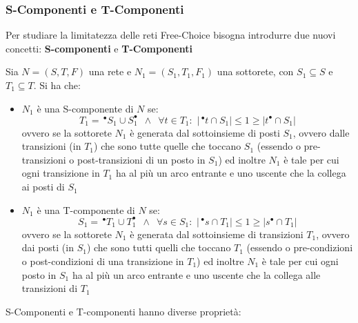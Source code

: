 \documentclass[a4paper,12pt, oneside]{book}
\begin{document}
\subsubsection{S-Componenti e T-Componenti}
Per studiare la limitatezza delle reti Free-Choice bisogna introdurre due nuovi
concetti: \textbf{S-componenti} e \textbf{T-Componenti}
\begin{definizione}
  Sia $N = (S, T , F )$ una rete e $N_1 = (S_1 , T_1 , F_1 )$ una sottorete, con
  $S_1\subseteq S$ e $T_1\subseteq T$. Si ha che:
  \begin{itemize}
    \item $N_1$ è una S-componente di $N$ se:
    \[T_1=\,^\bullet S_1\cup S_1^\bullet \,\,\,\land \,\,\,\forall t\in
      T_1:\,\, |\,^\bullet t\cap S_1|\leq 1 \geq |t^\bullet \cap S_1|\]
    ovvero se la sottorete $N_1$ è generata dal sottoinsieme di posti $S_1$,
    ovvero dalle transizioni (in $T_1$) che sono tutte quelle che toccano $S_1$
    (essendo o pre-transizioni o post-transizioni di un posto in $S_1$) ed
    inoltre $N_1$ è tale per cui ogni transizione in $T_1$ ha al più un arco
    entrante e uno uscente che la collega ai posti di $S_1$
    \item $N_1$ è una T-componente di $N$ se:
    \[S_1=\,^\bullet T_1\cup T_1^\bullet \,\,\,\land \,\,\,\forall s\in
      S_1:\,\, |\,^\bullet s\cap T_1|\leq 1 \geq |s^\bullet \cap T_1|\]
    ovvero se la sottorete $N_1$ è generata dal sottoinsieme di transizioni
    $T_1$, ovvero dai posti (in $S_1$) che sono tutti quelli che toccano $T_1$
    (essendo o pre-condizioni o post-condizioni di una transizione in $T_1$) ed
    inoltre $N_1$ è tale per cui ogni posto in $S_1$ ha al più un arco
    entrante e uno uscente che la collega alle transizioni di $T_1$
  \end{itemize}
\end{definizione}
S-Componenti e T-componenti hanno diverse proprietà:
\end{document}
